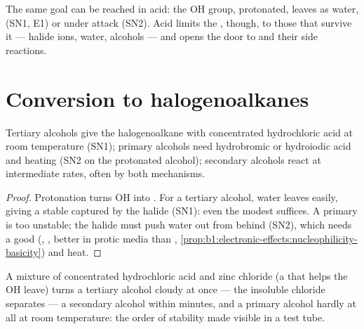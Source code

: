 The same goal can be reached in acid: the OH group, protonated, leaves as
water,  (SN1, E1) or under attack (SN2). Acid limits
the , though, to those that survive it --- halide ions, water,
alcohols --- and opens the door to  and their side reactions.

\section{Conversion to halogenoalkanes}

\begin{proposition}\label{prop:b1:alcohol-activation:hx-by-class}
Tertiary alcohols give the halogenoalkane with concentrated hydrochloric
acid at room temperature (SN1); primary alcohols need hydrobromic or
hydroiodic acid and heating (SN2 on the protonated alcohol); secondary
alcohols react at intermediate rates, often by both mechanisms.
\end{proposition}

\begin{proof}
Protonation turns OH into . For a tertiary alcohol, water leaves
easily, giving a stable  captured by the halide (SN1): even the
modest   suffices. A primary  is too
unstable; the halide must push water out from behind (SN2), which needs a
good  (, , better in protic media than ,
\cref{prop:b1:electronic-effects:nucleophilicity-basicity}) and heat.
\end{proof}

\begin{example}\label{ex:b1:alcohol-activation:lucas}
A mixture of concentrated hydrochloric acid and zinc chloride (a  that helps the OH leave) turns a tertiary alcohol cloudy at once ---
the insoluble chloride separates --- a secondary alcohol within minutes,
and a primary alcohol hardly at all at room temperature: the order of
 stability made visible in a test tube.
\end{example}

